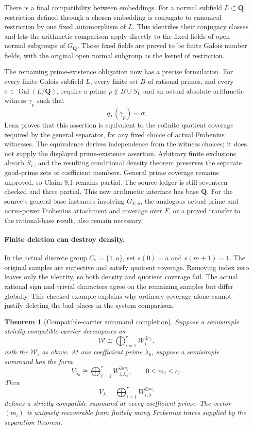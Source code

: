 \documentclass[11pt]{article}
\newtheorem{theorem}{Theorem}[section]
\theoremstyle{definition}
\theoremstyle{remark}
\newcommand{\Q}{\mathbf Q}
\begin{document}
There is a final compatibility between embeddings. For a normal subfield
$L\subset\overline{\Q}$, restriction defined through a chosen embedding
is conjugate to canonical restriction by one fixed automorphism of $L$.
This identifies their conjugacy classes and lets the arithmetic comparison
apply directly to the fixed fields of open normal subgroups of $G_{\Q}$.
Those fixed fields are proved to be finite Galois number fields, with the
original open normal subgroup as the kernel of restriction.

The remaining prime-existence obligation now has a precise formulation.
For every finite Galois subfield $L$, every finite set $B$ of rational
primes, and every $\sigma\in\operatorname{Gal}(L/\Q)$, require a prime
$p\notin B\cup S_L$ and an actual absolute arithmetic witness $\gamma_p$
such that
\[
 q_L(\gamma_p)\sim\sigma.
\]
Lean proves that this assertion is equivalent to the cofinite quotient
coverage required by the general separator, for any fixed choice of actual
Frobenius witnesses. The equivalence derives independence from the witness
choices; it does not supply the displayed prime-existence assertion.
Arbitrary finite exclusions absorb $S_L$, and the resulting conditional
density theorem preserves the separate good-prime sets of coefficient
members. General prime coverage remains unproved, so Claim 9.1 remains
partial. The source ledger is still seventeen checked and three partial.
This new arithmetic interface has base $\Q$. For the source's general-base
instances involving $G_{F,S}$, the analogous actual-prime and norm-power
Frobenius attachment and coverage over $F$, or a proved transfer to the
rational-base result, also remain necessary.

\paragraph{Finite deletion can destroy density.}
In the actual discrete group $C_2=\{1,a\}$, set $s(0)=a$ and $s(m+1)=1$.
The original samples are surjective and satisfy quotient coverage. Removing
index zero leaves only the identity, so both density and quotient coverage fail.
The actual rational sign and trivial characters agree on the remaining samples
but differ globally. This checked example explains why ordinary coverage alone
cannot justify deleting the bad places in the system comparison.

\begin{theorem}[Compatible-carrier summand completion]\label{px:9.2}
Suppose a semisimple strictly compatible carrier decomposes as
\[
\mathscr W
\cong
\bigoplus_{i=1}^{r}
\mathscr W_i^{\oplus c_i},
\]
with the \(\mathscr W_i\) as above.  At one coefficient prime \(\lambda_0\), suppose a semisimple summand has the form
\[
V_{\lambda_0}
\cong
\bigoplus_{i=1}^{r}
W_{i,\lambda_0}^{\oplus m_i},
\qquad
0\le m_i\le c_i.
\]
Then
\[
\boxed{
V_\lambda
=
\bigoplus_{i=1}^{r}
W_{i,\lambda}^{\oplus m_i}
}
\]
defines a strictly compatible summand at every coefficient prime.  The vector \((m_i)\) is uniquely recoverable from finitely many Frobenius traces supplied by the separation theorem.
\end{theorem}
\end{document}
